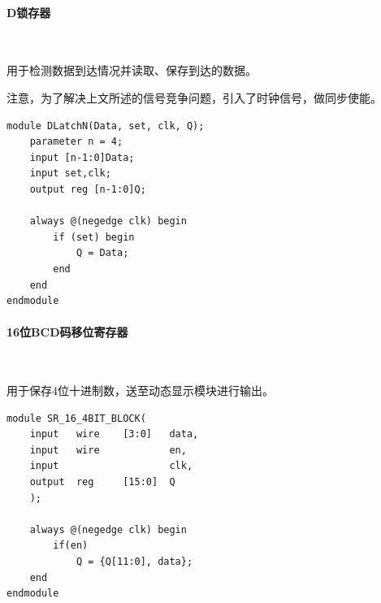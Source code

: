 \documentclass[UTF8]{ctexart}
\numberwithin{figure}{subsection}
\numberwithin{table}{subsection}
\numberwithin{equation}{subsection}
\begin{document}
\paragraph{D锁存器}~
\par 用于检测数据到达情况并读取、保存到达的数据。
\par 注意，为了解决上文所述的信号竞争问题，引入了时钟信号，做同步使能。
\begin{lstlisting}[style={verilog-style}]
module DLatchN(Data, set, clk, Q);
    parameter n = 4;
    input [n-1:0]Data;
    input set,clk;
    output reg [n-1:0]Q;

    always @(negedge clk) begin
        if (set) begin
            Q = Data;
        end
    end
endmodule
\end{lstlisting}


\paragraph{16位BCD码移位寄存器}~
\par 用于保存4位十进制数，送至动态显示模块进行输出。
\begin{lstlisting}[style={verilog-style}]
module SR_16_4BIT_BLOCK(
    input   wire    [3:0]   data,
    input   wire            en,
    input                   clk,
    output  reg     [15:0]  Q
    );

    always @(negedge clk) begin
        if(en)
            Q = {Q[11:0], data};
    end
endmodule
\end{lstlisting}
\end{document}
